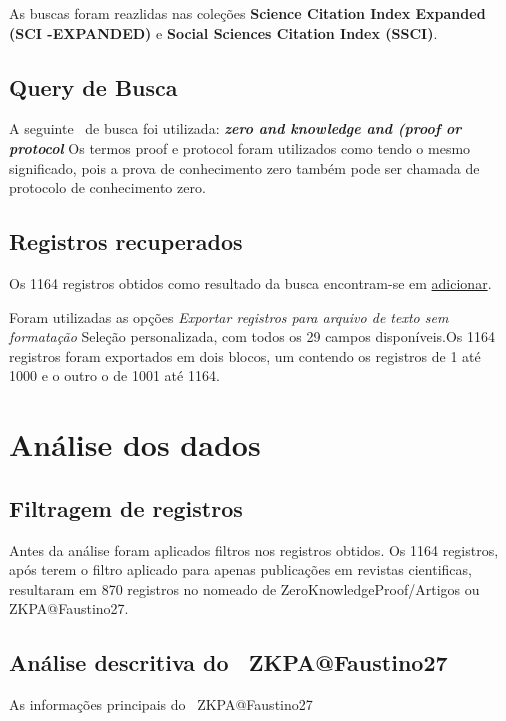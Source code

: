 As buscas foram reazlidas nas coleções \textbf{Science  Citation  Index  Expanded (SCI -EXPANDED)} e \textbf{Social  Sciences  Citation  Index (SSCI)}.

\subsection{Query de Busca}
A seguinte \querry\ de busca foi utilizada:
\textit{\textbf{zero and knowledge and (proof or protocol}}
Os termos proof e protocol foram utilizados como tendo o mesmo significado, pois a prova de conhecimento zero também pode ser chamada de protocolo de conhecimento zero.

\subsection{Registros recuperados}

Os 1164 registros obtidos como resultado da busca encontram-se em \url{adicionar}.

Foram utilizadas as opções \textit{Exportar registros para arquivo de texto sem formatação} Seleção personalizada, com todos os 29 campos disponíveis.Os 1164 registros foram exportados em dois blocos, um contendo os registros de 1 até 1000 e o outro o de 1001 até 1164.

\section{Análise dos dados}

\subsection{Filtragem de registros}

Antes da análise foram aplicados filtros nos registros obtidos. Os 1164 registros, após terem o filtro aplicado para apenas publicações em revistas cientificas, resultaram em 870 registros no \dataset nomeado de ZeroKnowledgeProof/Artigos ou ZKPA@Faustino27.

\subsection{Análise descritiva do \dataset\   ZKPA@Faustino27}

As informações principais do \dataset\ ZKPA@Faustino27
